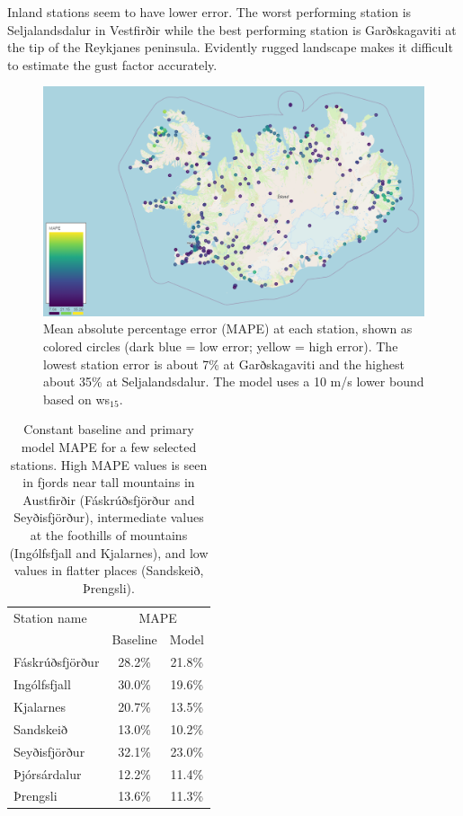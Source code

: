 Inland stations seem to have lower error. The worst performing station is Seljalandsdalur in Vestfirðir while the best performing station is Garðskagaviti at the tip of the Reykjanes peninsula. Evidently rugged landscape makes it difficult to estimate the gust factor accurately.

\begin{figure}[h]
    \centering
    \includegraphics[scale = 0.5]{Figures/errorMap.png}
\caption[MAPE distribution by station]{Mean absolute percentage error (MAPE) at each station, shown as colored circles (dark blue = low error; yellow = high error). The lowest station error is about 7\% at Garðskagaviti and the highest about 35\% at Seljalandsdalur. The model uses a 10 m/s lower bound based on ws$_{15}$.}
\label{fig:errorMap}
\end{figure}

\begin{table}[h]
    \caption[Primary model MAPE by selected stations]{Constant baseline and primary model MAPE for a few selected stations. High MAPE values is seen in fjords near tall mountains in Austfirðir (Fáskrúðsfjörður and Seyðisfjörður), intermediate values at the foothills of mountains (Ingólfsfjall and Kjalarnes), and low values in flatter places (Sandskeið, Þrengsli).}
    \label{table:more_specific_sites}
    \centering
    \begin{tabular}{lcc}
        \toprule
        Station name & \multicolumn{2}{c}{MAPE}\\
         & Baseline & Model\\
        \midrule
        Fáskrúðsfjörður & 28.2\% & 21.8\%\\
        Ingólfsfjall & 30.0\% & 19.6\%\\
        Kjalarnes & 20.7\% & 13.5\% \\
        Sandskeið & 13.0\% & 10.2\%\\
        Seyðisfjörður & 32.1\% & 23.0\%\\
        Þjórsárdalur & 12.2\% & 11.4\%\\
        Þrengsli & 13.6\% & 11.3\%\\
        \bottomrule
    \end{tabular}
\end{table}

